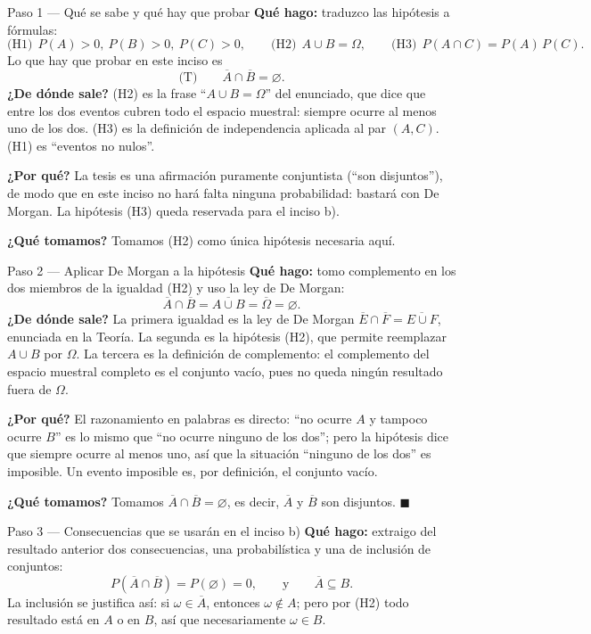 \documentclass[11pt]{article}
\begin{document}
\begin{sol}
\begin{paso}{Paso 1 --- Qué se sabe y qué hay que probar}
\textbf{Qué hago:} traduzco las hipótesis a fórmulas:
\[
\text{(H1)}\ \ P(A)>0,\ P(B)>0,\ P(C)>0,\qquad
\text{(H2)}\ \ A\cup B=\Omega,\qquad
\text{(H3)}\ \ P(A\cap C)=P(A)\,P(C).
\]
Lo que hay que probar en este inciso es
\[
\text{(T)}\qquad \overline{A}\cap\overline{B}=\varnothing .
\]
\textbf{¿De dónde sale?} (H2) es la frase ``$A\cup B=\Omega$'' del enunciado, que dice que
entre los dos eventos cubren todo el espacio muestral: siempre ocurre al menos uno de los dos.
(H3) es la definición de independencia aplicada al par $(A,C)$. (H1) es ``eventos no nulos''.

\textbf{¿Por qué?} La tesis es una afirmación puramente conjuntista (``son disjuntos''), de
modo que en este inciso no hará falta ninguna probabilidad: bastará con De Morgan. La
hipótesis (H3) queda reservada para el inciso b).

\textbf{¿Qué tomamos?} Tomamos (H2) como única hipótesis necesaria aquí.
\end{paso}

\begin{paso}{Paso 2 --- Aplicar De Morgan a la hipótesis}
\textbf{Qué hago:} tomo complemento en los dos miembros de la igualdad (H2) y uso la ley de De
Morgan:
\[
\overline{A}\cap\overline{B}=\overline{A\cup B}=\overline{\Omega}=\varnothing .
\]
\textbf{¿De dónde sale?} La primera igualdad es la ley de De Morgan
$\overline{E}\cap\overline{F}=\overline{E\cup F}$, enunciada en la Teoría. La segunda es la
hipótesis (H2), que permite reemplazar $A\cup B$ por $\Omega$. La tercera es la definición de
complemento: el complemento del espacio muestral completo es el conjunto vacío, pues no queda
ningún resultado fuera de $\Omega$.

\textbf{¿Por qué?} El razonamiento en palabras es directo: ``no ocurre $A$ y tampoco ocurre
$B$'' es lo mismo que ``no ocurre ninguno de los dos''; pero la hipótesis dice que siempre
ocurre al menos uno, así que la situación ``ninguno de los dos'' es imposible. Un evento
imposible es, por definición, el conjunto vacío.

\textbf{¿Qué tomamos?} Tomamos $\overline{A}\cap\overline{B}=\varnothing$, es decir,
$\overline{A}$ y $\overline{B}$ son disjuntos. $\blacksquare$
\end{paso}

\begin{paso}{Paso 3 --- Consecuencias que se usarán en el inciso b)}
\textbf{Qué hago:} extraigo del resultado anterior dos consecuencias, una probabilística y una
de inclusión de conjuntos:
\[
P(\overline{A}\cap\overline{B})=P(\varnothing)=0,
\qquad\text{y}\qquad
\overline{A}\subseteq B .
\]
La inclusión se justifica así: si $\omega\in\overline{A}$, entonces $\omega\notin A$; pero por
(H2) todo resultado está en $A$ o en $B$, así que necesariamente $\omega\in B$.


\end{paso}
\end{sol}
\end{document}
